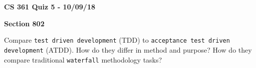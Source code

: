 \documentclass{exam}
\begin{document}
\begin{center}
	\textbf{CS 361 Quiz 5 - 10/09/18}
	
	\textbf{Section 802}
	
	\vspace{1em}
	
\end{center}

\begin{questions}
	
\question[10] Compare \texttt{test driven development} (TDD) to \texttt{acceptance test driven development} (ATDD). How do they differ in method and purpose? How do they compare traditional \texttt{waterfall} methodology tasks?

\end{questions}
\end{document}
